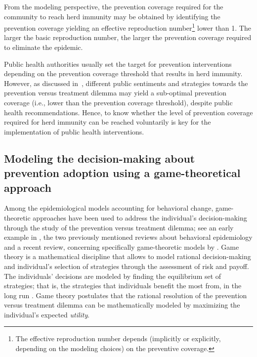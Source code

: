 From the modeling perspective, the prevention coverage required for the community to reach herd immunity may be obtained by identifying the prevention coverage yielding an effective reproduction number\footnote{The effective reproduction number depends (implicitly or explicitly, depending on the modeling choices) on the preventive coverage.} lower than 1. The larger the basic reproduction number, the larger the prevention coverage required to eliminate the epidemic. 

Public health authorities usually set the target for prevention interventions depending on the prevention coverage threshold that results in herd immunity. However, as discussed in~, different public sentiments and strategies towards the prevention versus treatment dilemma may yield a sub-optimal prevention coverage (i.e., lower than the prevention coverage threshold), despite public health recommendations. Hence, to know whether the level of prevention coverage required for herd immunity can be reached voluntarily is key for the implementation of public health interventions. 


\subsection{Modeling the decision-making about prevention adoption using a game-theoretical approach}
\label{Intro:DecisionModel}

Among the epidemiological models accounting for behavioral change, game-theoretic approaches have been used to address the individual's decision-making through the study of the prevention versus treatment dilemma; see an early example in \cite{Bauch2013}, the two previously mentioned reviews about behavioral epidemiology \cite[]{Verelst2016,Wang2016} and a recent review, concerning specifically game-theoretic models by \cite{Chang2020}. Game theory is a mathematical discipline that allows to model rational decision-making and individual's selection of strategies through the assessment of risk and payoff. The individuals' decisions are modeled by finding the equilibrium set of strategies; that is, the strategies that individuals benefit the most from, in the long run \cite[]{Manfredi2013}. Game theory postulates that the rational resolution of the prevention versus treatment dilemma can be mathematically modeled by maximizing the individual's expected {\it utility}. 

